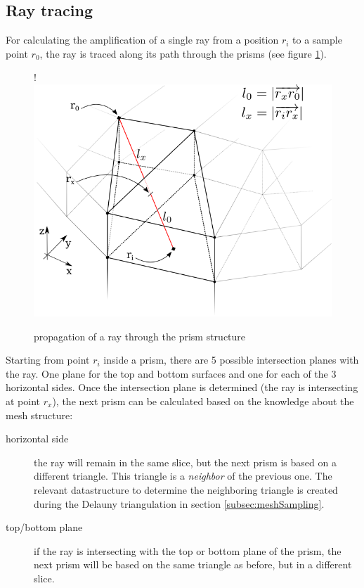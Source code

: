 \subsection{Ray tracing}
\label{subsec:raytracing}

For calculating the amplification of a single ray from a position $r_i$ to a sample
point $r_0$, the ray is traced along its path through the prisms (see figure
\ref{graphic:prism_propagation}). 

\begin{figure}[H]
  \centerline{
     {!} {\includegraphics{./graphics/prism_propagation_3.png}}
  }
  \caption{propagation of a ray through the prism structure}
  \label{graphic:prism_propagation}
\end{figure}

Starting from point $r_i$ inside a prism, there are 5 possible intersection
planes with the ray. One plane for the top and bottom surfaces and one for each
of the 3 horizontal sides. Once the intersection plane is determined (the ray is
intersecting at point $r_x$), the next prism can be calculated based on the
knowledge about the mesh structure:

\begin{description}

  \item[horizontal side]
    the ray will remain in the same slice, but the next prism is based on a
    different triangle. This triangle is a \emph{neighbor} of the previous one.
    The relevant datastructure to determine the neighboring triangle is created
    during the Delauny triangulation in section \ref{subsec:meshSampling}.

  \item[top/bottom plane]
    if the ray is intersecting with the top or bottom plane of the prism, the
    next prism will be based on the same triangle as before, but in a different
    slice.

\end{description}

